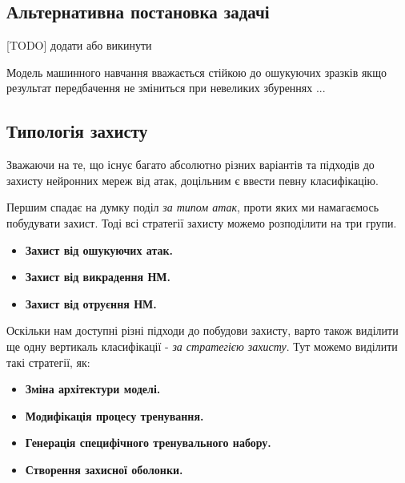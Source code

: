 \documentclass[14pt,a4paper]{extarticle}
\newcounter{e}
\numberwithin{equation}{section}
\numberwithin{figure}{section}
\begin{document}
 \subsection{Альтернативна постановка задачі}
 
 [TODO] додати або викинути
 
 Модель машинного навчання вважається стійкою до ошукуючих зразків якщо результат передбачення не зміниться при невеликих збуреннях ...
 
 
 
 \subsection{Типологія захисту}
 Зважаючи на те, що існує багато абсолютно різних варіантів та підходів до захисту нейронних мереж від атак, доцільним є ввести певну класифікацію.
 
 Першим спадає на думку поділ \textit{за типом атак}, проти яких ми намагаємось побудувати захист. Тоді всі стратегії захисту можемо розподілити на три групи. 
 
 \begin{itemize}
 	\item \textbf{Захист від ошукуючих атак.}
 	
 	\item \textbf{Захист від викрадення НМ.} 
 	
 	\item \textbf{Захист від отруєння НМ.}
 \end{itemize}
 
 Оскільки нам доступні різні підходи до побудови захисту, варто також виділити ще одну вертикаль класифікації - \textit{за стратегією захисту}. Тут можемо виділити такі стратегії, як:
 
 \begin{itemize}
 	\item \textbf{Зміна архітектури моделі.}
 	
 	\item \textbf{Модифікація процесу тренування.}
 	
 	\item \textbf{Генерація специфічного тренувального набору.}
 	
 	\item \textbf{Створення захисної оболонки.}
 \end{itemize}
 
\end{document}
